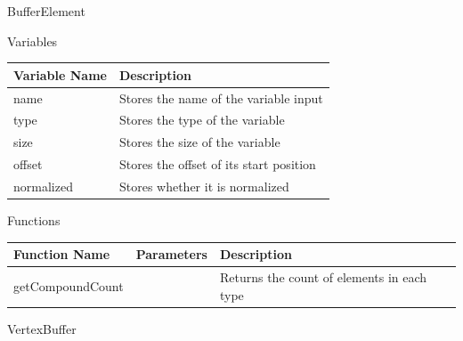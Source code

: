 \documentclass[../../Main.tex]{subfiles}
\begin{document}
    BufferElement
    \begin{center}
        Variables
        \begin{tabular}{ | m{} | m{} | }
            \hline
            \textbf{Variable Name} & \textbf{Description} \\
            \hline
            name & Stores the name of the variable input \\
            \hline
            type & Stores the type of the variable \\
            \hline
            size & Stores the size of the variable \\
            \hline
            offset & Stores the offset of its start position \\
            \hline
            normalized & Stores whether it is normalized \\
            \hline
        \end{tabular}
        Functions
        \begin{tabular}{ | m{} | m{}| m{} | }
            \hline
            \textbf{Function Name} & \textbf{Parameters} & \textbf{Description} \\
            \hline
            getCompoundCount & & Returns the count of elements in each type \\
            \hline
        \end{tabular}
    \end{center}
    VertexBuffer
\end{document}

